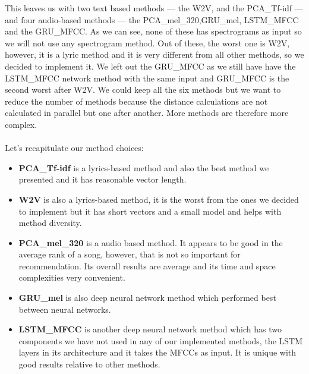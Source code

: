 This leaves us with two text based methods --- the W2V, and the PCA\_Tf-idf --- and four audio-based methods --- the PCA\_mel\_320,GRU\_mel, LSTM\_MFCC and the GRU\_MFCC. As we can see, none of these has spectrograms as input so we will not use any spectrogram method. Out of these, the worst one is W2V, however, it is a lyric method and it is very different from all other methods, so we decided to implement it. We left out the GRU\_MFCC as we still have have the LSTM\_MFCC network method with the same input and GRU\_MFCC is the second worst after W2V. We could keep all the six methods but we want to reduce the number of methods because the distance calculations are not calculated in parallel but one after another. More methods are therefore more complex. \\ \\
Let's recapitulate our method choices:
\begin{itemize}
    \item \textbf{PCA\_Tf-idf} is a lyrics-based method and also the best method we presented and it has reasonable vector length.
    \item \textbf{W2V} is also a lyrics-based method, it is the worst from the ones we decided to implement but it has short vectors and a small model and helps with method diversity.
    \item \textbf{PCA\_mel\_320} is a audio based method. It appears to be good in the average rank of a song, however, that is not so important for recommendation. Its overall results are average and its time and space complexities very convenient.
    \item \textbf{GRU\_mel} is also deep neural network method which performed best between neural networks.
    \item \textbf{LSTM\_MFCC} is another deep neural network method which has two components we have not used in any of our implemented methods, the LSTM layers in its architecture and it takes the MFCCs as input. It is unique with good results relative to other methods. 
\end{itemize}


